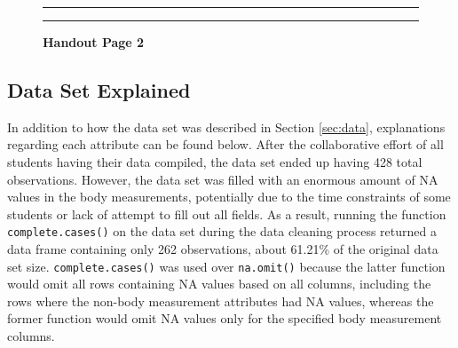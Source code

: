 \documentclass[]{article}
\begin{document}
\begin{figure}[!ht]
    \hrule
    \caption{ \textbf{Handout Page 2} }
    \begin{center}
    \end{center}
    \label{fig:handout-2}
    \hrule
\end{figure}

\newpage

\subsection{Data Set Explained}
\label{sec:appendix-dataset-ex}

In addition to how the data set was described in Section \ref{sec:data},
explanations regarding each attribute can be found below. After the
collaborative effort of all students having their data compiled, the
data set ended up having 428 total observations. However, the data set
was filled with an enormous amount of NA values in the body
measurements, potentially due to the time constraints of some students
or lack of attempt to fill out all fields. As a result, running the
function \texttt{complete.cases()} on the data set during the data
cleaning process returned a data frame containing only 262 observations,
about 61.21\% of the original data set size. \texttt{complete.cases()}
was used over \texttt{na.omit()} because the latter function would omit
all rows containing NA values based on all columns, including the rows
where the non-body measurement attributes had NA values, whereas the
former function would omit NA values only for the specified body
measurement columns.
\end{document}
